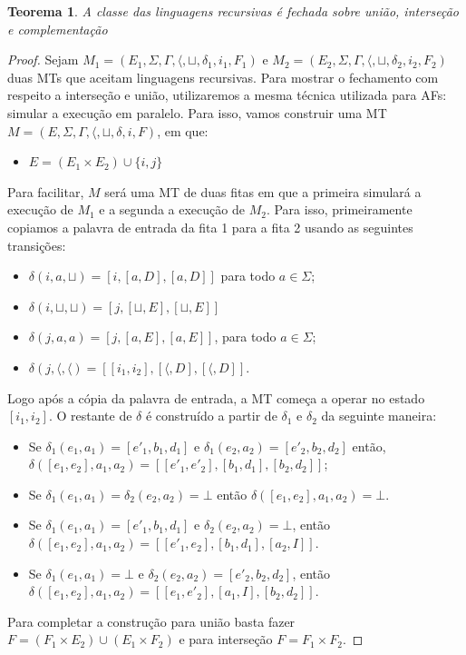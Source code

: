 \documentclass[a4paper]{article}
\newtheorem{Theorem}{Teorema}
\theoremstyle{definition}
\begin{document}
       \begin{Theorem}
         A classe das linguagens recursivas é fechada sobre união, interseção e
         complementação
       \end{Theorem}
       \begin{proof}
         Sejam $M_1=(E_1,\Sigma, \Gamma, \langle, \sqcup, \delta_1, i_1,F_1)$ e
         $M_2=(E_2,\Sigma, \Gamma, \langle, \sqcup, \delta_2, i_2,F_2)$
         duas MTs que aceitam linguagens recursivas. Para mostrar o fechamento
         com respeito a interseção e união, utilizaremos a mesma técnica
         utilizada para AFs: simular a execução em paralelo. Para isso, vamos
         construir uma MT $M=(E,\Sigma, \Gamma, \langle, \sqcup,\delta, i,F)$,
         em que:
         \begin{itemize}
            \item $E = (E_1 \times E_2) \cup\{i,j\}$
         \end{itemize}
         Para facilitar, $M$ será uma MT de duas fitas em que a primeira
         simulará a execução de $M_1$ e a segunda a execução de $M_2$. Para
         isso, primeiramente copiamos a palavra de entrada da fita 1 para a fita
         2 usando as seguintes transições:
         \begin{itemize}
           \item $\delta(i,a,\sqcup) = [i,[a,D],[a,D]]$ para todo $a\in \Sigma$;
           \item $\delta(i,\sqcup,\sqcup) = [j,[\sqcup,E],[\sqcup,E]]$
           \item $\delta(j,a,a) = [j,[a,E],[a,E]]$, para todo $a\in\Sigma$;
           \item $\delta(j,\langle, \langle) = [[i_1,i_2],[\langle, D],[\langle,D]]$.
         \end{itemize}
         Logo após a cópia da palavra de entrada, a MT começa a operar no estado
         $[i_1,i_2]$. O restante de $\delta$ é construído a partir de $\delta_1$
         e $\delta_2$ da seguinte maneira:
         \begin{itemize}
           \item Se $\delta_1(e_1,a_1) = [e'_1,b_1,d_1]$ e $\delta_1(e_2,a_2) =
             [e'_2,b_2,d_2]$ então, $\delta([e_1,e_2],a_1,a_2) =
             [[e'_1,e'_2],[b_1,d_1],[b_2,d_2]]$; 
           \item Se $\delta_1(e_1,a_1) = \delta_2(e_2,a_2) = \bot$ então 
             $\delta([e_1,e_2],a_1,a_2) = \bot$.
           \item Se $\delta_1(e_1,a_1) = [e'_1,b_1,d_1]$ e $\delta_2(e_2,a_2) =
             \bot$, então $\delta([e_1,e_2],a_1,a_2) =
             [[e'_1,e_2],[b_1,d_1],[a_2,I]]$.
           \item Se $\delta_1(e_1,a_1) = \bot$ e $\delta_2(e_2,a_2) =
             [e'_2,b_2,d_2]$, então $\delta([e_1,e_2],a_1,a_2) =
             [[e_1,e'_2],[a_1,I],[b_2,d_2]]$.           
         \end{itemize}
         Para completar a construção para união basta fazer $F = (F_1 \times
         E_2) \cup (E_1\times F_2)$ e para interseção $F = F_1 \times F_2$.


\end{proof}
\end{document}
